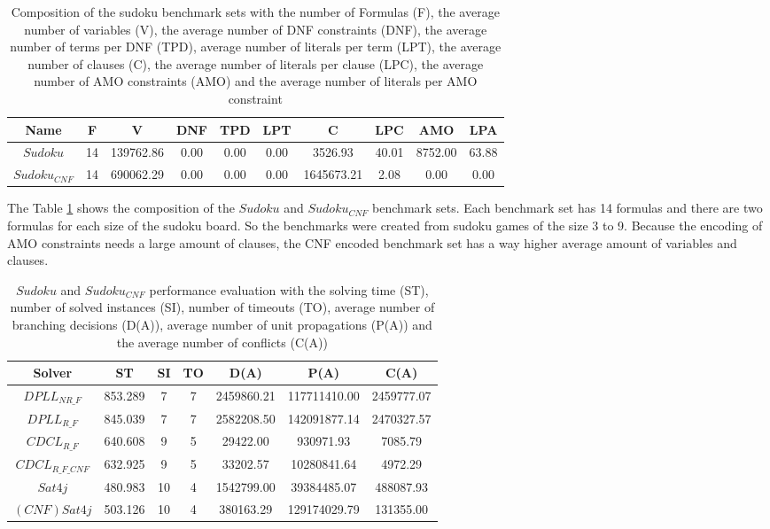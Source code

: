 \begin{table}[!htb]
\centering
\caption[Composition of the sudoku benchmark sets]{Composition of the sudoku benchmark sets with the number of Formulas (F), the average number of variables (V), the average number of DNF constraints (DNF), the average number of terms per DNF (TPD), average number of literals per term (LPT), the average number of clauses (C), the average number of literals per clause (LPC), the average number of AMO constraints (AMO) and the average number of literals per AMO constraint}
\label{tab:sudoku}
\begin{tabular}{|c|c|c|c|c|c|c|c|c|c|}
\hline
Name & F & V & DNF & TPD & LPT & C & LPC & AMO & LPA \\
\hline
$Sudoku$ & 14 & 139762.86 & 0.00 & 0.00 & 0.00 & 3526.93 & 40.01 & 8752.00 & 63.88 \\ 
 \hline 
$Sudoku_{CNF}$ & 14 & 690062.29 & 0.00 & 0.00 & 0.00 & 1645673.21 & 2.08 & 0.00 & 0.00 \\ 
 \hline 
\end{tabular}
\end{table}

The Table \ref{tab:sudoku} shows the composition of the $Sudoku$ and $Sudoku_{CNF}$ benchmark sets. Each benchmark set has 14 formulas and there are two formulas for each size of the sudoku board. So the benchmarks were created from sudoku games of the size 3 to 9. Because the encoding of AMO constraints needs a large amount of clauses, the CNF encoded benchmark set has a way higher average amount of variables and clauses.

\begin{table}[!htb]
\centering
\caption[$Sudoku$ and $Sudoku_{CNF}$ performance evaluation]{$Sudoku$ and $Sudoku_{CNF}$ performance evaluation with the solving time (ST), number of solved instances (SI), number of timeouts (TO), average number of branching decisions (D(A)), average number of unit propagations (P(A)) and the average number of conflicts (C(A))}
\label{tab:sudokuSat}
\begin{tabular}{|c|c|c|c|c|c|c|}
\hline
Solver & ST & SI & TO & D(A) & P(A) & C(A)\\ 
\hline
$DPLL_{NR\_F}$ & 853.289 & 7 & 7 & 2459860.21 & 117711410.00 & 2459777.07 \\ 
\hline
$DPLL_{R\_F}$ & 845.039 & 7 & 7 & 2582208.50 & 142091877.14 & 2470327.57 \\ 
\hline
$CDCL_{R\_F}$ & 640.608 & 9 & 5 & 29422.00 & 930971.93 & 7085.79 \\ 
\hline
$CDCL_{R\_F\_CNF}$ & 632.925 & 9 & 5 & 33202.57 & 10280841.64 & 4972.29 \\ 
\hline
$Sat4j$ & 480.983 & 10 & 4 & 1542799.00 & 39384485.07 & 488087.93 \\
\hline
$(CNF)Sat4j$ & 503.126 & 10 & 4 & 380163.29 & 129174029.79 & 131355.00 \\ 
\hline
\end{tabular}
\end{table}

